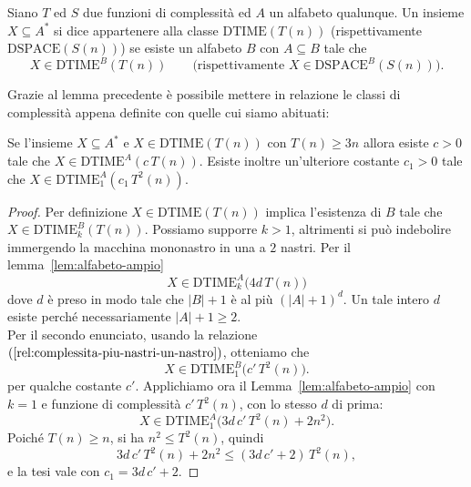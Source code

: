 \begin{defi}
Siano $T$ ed $S$ due funzioni di complessità ed $A$ un alfabeto qualunque. Un insieme
$X \subseteq A^*$ si dice appartenere alla classe $\mathrm{DTIME}(T(n))$ (rispettivamente
$\mathrm{DSPACE}(S(n))$) se esiste un alfabeto $B$ con $A \subseteq B$ tale che
\[
  X \in \mathrm{DTIME}^B(T(n))
  \qquad\text{(rispettivamente } X \in \mathrm{DSPACE}^B(S(n))\text{).}
\]
\end{defi}

Grazie al lemma precedente è possibile mettere in relazione le classi di complessità appena
definite con quelle cui siamo abituati:

\begin{prop}
Se l'insieme $X \subseteq A^*$ e $X \in \mathrm{DTIME}(T(n))$ con $T(n)\geq 3n$ allora esiste $c > 0$ tale
che $X \in \mathrm{DTIME}^A(c\,T(n))$. Esiste inoltre un'ulteriore costante $c_1 > 0$ tale
che $X \in \mathrm{DTIME}^A_1(c_1\,T^2(n))$.
\begin{proof}
Per definizione $X \in \mathrm{DTIME}(T(n))$ implica l'esistenza di $B$ tale che
$X \in \mathrm{DTIME}^B_k(T(n))$. Possiamo supporre $k > 1$, altrimenti si può indebolire
immergendo la macchina mononastro in una a $2$ nastri. Per il
lemma~\ref{lem:alfabeto-ampio}
\[
  X \in \mathrm{DTIME}^A_k\big(4d\,T(n)\big)
\]
dove $d$ è preso in modo tale che $|B|+1$ è al più $(|A|+1)^d$. Un tale intero $d$ esiste
perché necessariamente $|A|+1 \geq 2$.
\\
Per il secondo enunciato, 
usando la relazione~$(\ref{rel:complessita-piu-nastri-un-nastro})$,
otteniamo che
\[
  X \in \mathrm{DTIME}^B_1\big(c'\,T^2(n)\big).
\]
per qualche costante $c'$.
Applichiamo ora il Lemma~\ref{lem:alfabeto-ampio} con $k=1$ e funzione di complessità
$c'\,T^2(n)$, con lo stesso $d$ di prima:
\[
  X \in \mathrm{DTIME}^A_1\big(3d\,c'\,T^2(n) + 2n^2\big).
\]
Poiché $T(n) \geq n$, si ha $n^2 \leq T^2(n)$, quindi
\[
  3d\,c'\,T^2(n) + 2n^2 \leq (3d\,c' + 2)\,T^2(n),
\]
e la tesi vale con $c_1 = 3d\,c' + 2$.
\end{proof}
\end{prop}

